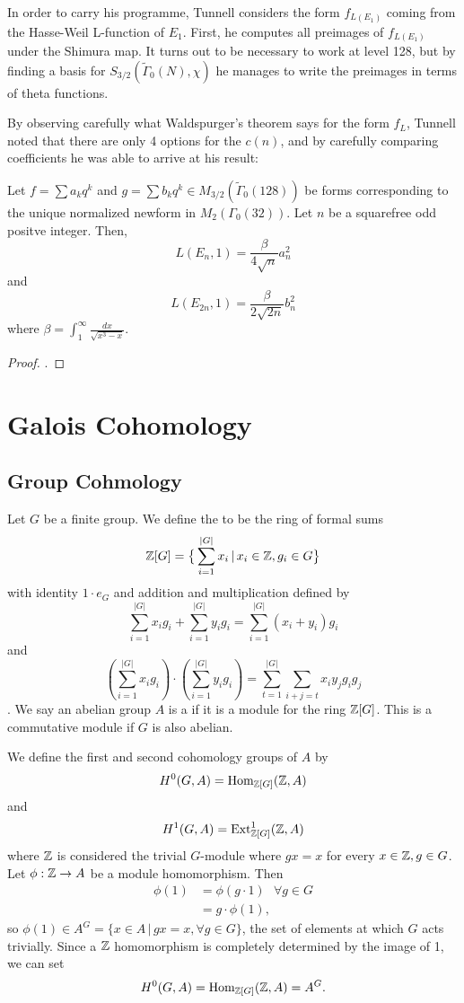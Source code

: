 \documentclass[12pt, a4paper]{amsart}
\begin{document}
In order to carry his programme, Tunnell considers the form $f_{L(E_1)}$ coming
from the Hasse-Weil L-function of $E_1$.  First, he computes all preimages of
$f_{L(E_1)}$
under the Shimura map.
It turns out to be necessary to work at level 128, but by finding a basis
for $S_{3/2}(\tilde{\Gamma}_0(N), \chi)$ he manages to write the preimages in
terms of theta functions.

By observing carefully what Waldspurger's theorem
says for the form $f_L$, Tunnell noted that
there are only 4 options for the $c(n)$, and by carefully comparing coefficients
he was able to arrive at his result:

\begin{thm}
  Let $f = \sum a_k q^k$ and $g = \sum b_k q^k \in
  M_{3/2}(\tilde{\Gamma}_0(128))$ be forms corresponding to the unique
  normalized newform
  in $M_2(\Gamma_0(32))$. Let $n$ be a squarefree odd positve integer. Then,
  \[L(E_n,1) = \frac{\beta}{4\sqrt{n}} a_n^2 \]
  and
  \[L(E_{2n},1) = \frac{\beta}{2 \sqrt{2n}} b_n^2 \]
  where $\beta = \int_1^\infty \frac{dx}{\sqrt{x^3-x}}.$
\end{thm}
\begin{proof}
  \cite[See][Theorem 3, Page 328-329]{Tunnell}.
\end{proof}


\section{Galois Cohomology}

\subsection{Group Cohmology}

Let $G$ be a finite group. We define the  to
be the ring of formal sums
\[ {\mathbb Z}[G] = \big\{ \sum\limits_{i=1}^{|G|} x_i \, | \, x_i \in {\mathbb Z}, g_i \in G \big\}\]
with identity $1 \cdot e_G$ and addition and multiplication defined by
\[\sum\limits_{i=1}^{|G|} x_ig_i + \sum\limits_{i=1}^{|G|} y_ig_i =
\sum\limits_{i=1}^{|G|} (x_i+y_i)g_i\]
and \[(\sum\limits_{i=1}^{|G|} x_ig_i) \cdot (\sum\limits_{i=1}^{|G|} y_ig_i) =
\sum\limits_{t=1}^{|G|} \sum\limits_{i+j = t} x_iy_jg_ig_j \].
We say an abelian group $A$ is a  if it is a module
for the ring ${\mathbb Z}[G]$. This is a commutative module if $G$ is also abelian.

We define the
first and second cohomology groups of $A$ by
\[H^0 (G, A) = \text{Hom}_{{\mathbb Z}[G]}({\mathbb Z}, A)\] and
\[H^1 (G, A) = \text{Ext}^1_{{\mathbb Z}[G]} ({\mathbb Z}, A)\]
where ${\mathbb Z}$ is considered the trivial $G$-module where $g x = x$ for every
$x \in {\mathbb Z}, g \in G$.
Let $\phi : {\mathbb Z} \rightarrow A$ be a module homomorphism. Then
\[\begin{split} \phi(1) &= \phi(g \cdot 1) \,\,\,\, \forall g \in G \\
    &= g \cdot \phi(1) , \end{split}\]
so $\phi(1) \in A^G = \{x \in A \, | \, gx = x, \forall g \in G\}$, the set
of elements at which $G$ acts trivially. Since a ${\mathbb Z}$ homomorphism is
completely determined by the image of 1, we can set
\[ H^0 (G, A) = \text{Hom}_{{\mathbb Z}[G]}({\mathbb Z}, A) = A^G .\] 
\end{document}
